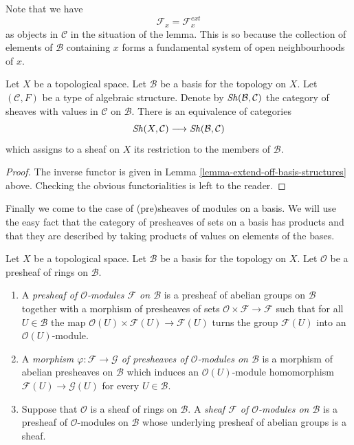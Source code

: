 \noindent
Note that we have
$$
\mathcal{F}_x = \mathcal{F}_x^{ext}
$$
as objects in $\mathcal{C}$
in the situation of the lemma. This is so because the
collection of elements of $\mathcal{B}$ containing
$x$ forms a fundamental system of open neighbourhoods of $x$.

\begin{lemma}
\label{lemma-restrict-basis-equivalence-structures}
Let $X$ be a topological space.
Let $\mathcal{B}$ be a basis for the topology on $X$.
Let $(\mathcal{C}, F)$ be a type of algebraic structure.
Denote by $\mathop{\mathit{Sh}}\nolimits(\mathcal{B}, \mathcal{C})$ the category of
sheaves with values in $\mathcal{C}$ on $\mathcal{B}$.
There is an equivalence of categories
$$
\mathop{\mathit{Sh}}\nolimits(X, \mathcal{C})
\longrightarrow
\mathop{\mathit{Sh}}\nolimits(\mathcal{B}, \mathcal{C})
$$
which assigns to a sheaf on $X$ its restriction to
the members of $\mathcal{B}$.
\end{lemma}

\begin{proof}
The inverse functor is given in
Lemma \ref{lemma-extend-off-basis-structures} above.
Checking the obvious functorialities is left to the
reader.
\end{proof}

\noindent
Finally we come to the case of (pre)sheaves of modules
on a basis. We will use the easy fact that the category
of presheaves of sets on a basis has products and that
they are described by taking products of values on
elements of the bases.

\begin{definition}
\label{definition-sheaf-modules-basis}
Let $X$ be a topological space. Let $\mathcal{B}$ be a
basis for the topology on $X$. Let $\mathcal{O}$ be
a presheaf of rings on $\mathcal{B}$.
\begin{enumerate}
\item A {\it presheaf of $\mathcal{O}$-modules $\mathcal{F}$
on $\mathcal{B}$} is a presheaf of abelian groups on
$\mathcal{B}$ together with a morphism of presheaves
of sets $\mathcal{O} \times \mathcal{F} \to \mathcal{F}$
such that for all $U \in \mathcal{B}$ the map
$\mathcal{O}(U) \times \mathcal{F}(U) \to \mathcal{F}(U)$
turns the group $\mathcal{F}(U)$ into an $\mathcal{O}(U)$-module.
\item A {\it morphism $\varphi : \mathcal{F} \to \mathcal{G}$
of presheaves of $\mathcal{O}$-modules on $\mathcal{B}$}
is a morphism of abelian presheaves on $\mathcal{B}$
which induces an $\mathcal{O}(U)$-module homomorphism
$\mathcal{F}(U) \to \mathcal{G}(U)$ for every $U \in \mathcal{B}$.
\item Suppose that $\mathcal{O}$ is a sheaf of rings
on $\mathcal{B}$. A {\it sheaf $\mathcal{F}$ of $\mathcal{O}$-modules
on $\mathcal{B}$} is a presheaf of $\mathcal{O}$-modules
on $\mathcal{B}$ whose underlying presheaf of abelian groups
is a sheaf.
\end{enumerate}
\end{definition}


